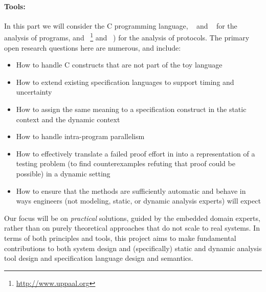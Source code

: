 \paragraph{Tools:} In this part we will consider the C programming
language, \framac~\cite{KKP2015:FAC} and \deepstate~\cite{DeepState}
for the analysis of programs, and
\uppaal~\footnote{\url{http://www.uppaal.org}} and
\prism~\cite{KNP2011:CAV}) for the analysis of protocols.  The primary open research questions here are numerous, and include:
\begin{itemize}[itemsep=0pt]
\item How to handle C constructs that are not part of the toy language
\item How to extend existing specification languages to support timing and uncertainty
\item How to assign the same meaning to a specification construct in
  the static \framac context and the dynamic \deepstate context
\item How to handle intra-program parallelism
\item How to effectively translate a failed proof effort in \framac
  into a representation of a testing problem (to find counterexamples
  refuting that proof could be possible) in a dynamic setting
\item How to ensure that the methods are sufficiently automatic
  and behave in ways engineers (not modeling, static, or dynamic
  analysis experts) will expect
\end{itemize}

Our focus will be on \emph{practical} solutions, guided by the
embedded domain experts, rather than on purely theoretical approaches
that do not scale to real systems.  In terms of both principles and
tools, this project aims to make fundamental contributions to both
system design and (specifically) static and dynamic analysis tool
design and specification language design and semantics.